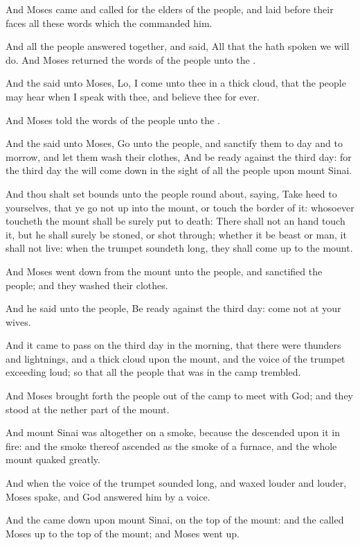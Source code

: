 \verse And Moses came and called for the elders of the people, and laid before their faces all these words which the \LORD commanded him.

\verse And all the people answered together, and said, All that the \LORD hath spoken we will do. And Moses returned the words of the people unto the \LORD.

\verse And the \LORD said unto Moses, Lo, I come unto thee in a thick cloud, that the people may hear when I speak with thee, and believe thee for ever.

And Moses told the words of the people unto the \LORD.

\verse And the \LORD said unto Moses, Go unto the people, and sanctify them to day and to morrow, and let them wash their clothes, \verse And be ready against the third day: for the third day the \LORD will come down in the sight of all the people upon mount Sinai.

\verse And thou shalt set bounds unto the people round about, saying, Take heed to yourselves, that ye go not up into the mount, or touch the border of it: whosoever toucheth the mount shall be surely put to death: \verse There shall not an hand touch it, but he shall surely be stoned, or shot through; whether it be beast or man, it shall not live: when the trumpet soundeth long, they shall come up to the mount.

\verse And Moses went down from the mount unto the people, and sanctified the people; and they washed their clothes.

\verse And he said unto the people, Be ready against the third day: come not at your wives.

\verse And it came to pass on the third day in the morning, that there were thunders and lightnings, and a thick cloud upon the mount, and the voice of the trumpet exceeding loud; so that all the people that was in the camp trembled.

\verse And Moses brought forth the people out of the camp to meet with God; and they stood at the nether part of the mount.

\verse And mount Sinai was altogether on a smoke, because the \LORD descended upon it in fire: and the smoke thereof ascended as the smoke of a furnace, and the whole mount quaked greatly.

\verse And when the voice of the trumpet sounded long, and waxed louder and louder, Moses spake, and God answered him by a voice.

\verse And the \LORD came down upon mount Sinai, on the top of the mount: and the \LORD called Moses up to the top of the mount; and Moses went up.

